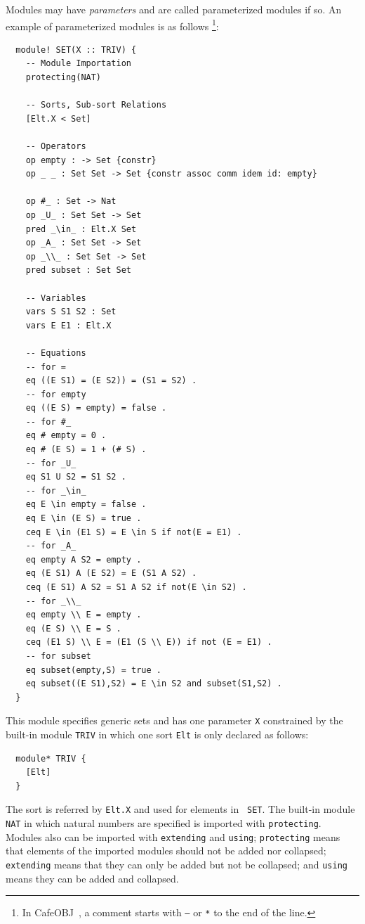 \documentclass[12pt]{report}
\newcommand{\cafeobj}{{\sf CafeOBJ}~}
\begin{document}
Modules may have {\it parameters} and are called parameterized modules
if so. An example of parameterized modules is as follows
\footnote{In \cafeobj, a comment starts with {\tt --} or {\tt **} to
  the end of the line.}:
\small
\begin{verbatim}
  module! SET(X :: TRIV) {
    -- Module Importation
    protecting(NAT)
  
    -- Sorts, Sub-sort Relations
    [Elt.X < Set]
  
    -- Operators
    op empty : -> Set {constr}
    op _ _ : Set Set -> Set {constr assoc comm idem id: empty}
  
    op #_ : Set -> Nat
    op _U_ : Set Set -> Set
    pred _\in_ : Elt.X Set
    op _A_ : Set Set -> Set
    op _\\_ : Set Set -> Set
    pred subset : Set Set
  
    -- Variables
    vars S S1 S2 : Set
    vars E E1 : Elt.X
  
    -- Equations
    -- for =
    eq ((E S1) = (E S2)) = (S1 = S2) .
    -- for empty
    eq ((E S) = empty) = false .
    -- for #_
    eq # empty = 0 .   
    eq # (E S) = 1 + (# S) . 
    -- for _U_
    eq S1 U S2 = S1 S2 .
    -- for _\in_
    eq E \in empty = false .
    eq E \in (E S) = true .
    ceq E \in (E1 S) = E \in S if not(E = E1) .
    -- for _A_
    eq empty A S2 = empty .
    eq (E S1) A (E S2) = E (S1 A S2) .
    ceq (E S1) A S2 = S1 A S2 if not(E \in S2) .
    -- for _\\_ 
    eq empty \\ E = empty .
    eq (E S) \\ E = S .
    ceq (E1 S) \\ E = (E1 (S \\ E)) if not (E = E1) .
    -- for subset
    eq subset(empty,S) = true .
    eq subset((E S1),S2) = E \in S2 and subset(S1,S2) .
  }
\end{verbatim}
\normalsize
This module specifies generic sets and has one parameter {\tt X}
constrained by the built-in module {\tt TRIV} in which one sort
{\tt Elt} is only declared as follows:
\small
\begin{verbatim}
  module* TRIV {
    [Elt]
  }
\end{verbatim}
\normalsize
The sort is referred by {\tt Elt.X} and used for elements in {\tt
  SET}. The built-in module {\tt NAT} in which natural numbers are
specified is imported with {\tt protecting}. Modules also can be
imported with {\tt extending} and {\tt using}; {\tt protecting} means
that elements of the imported modules should not be added nor
collapsed; {\tt extending} means that they can only be added but not
be collapsed; and {\tt using} means they can be added and collapsed.
\end{document}
